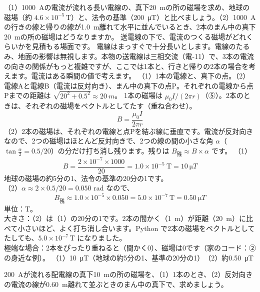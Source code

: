 \label{ph:電-6:ex12}
\begin{phreidai}[送電線の下の磁場]
（1）\qty{1000}{A}の電流が流れる長い電線の、真下\qty{20}{m}の所の磁場を求め、地球の磁場（約 $4.6\times10^{-5}$\,T）と、法令の基準（\qty{200}{\micro T}）と比べましょう。（2）\qty{1000}{A}の行きの線と帰りの線が\qty{1.0}{m}離れて水平に並んでいるとき、2本のまん中の真下\qty{20}{m}の所の磁場はどうなりますか。
\phbamen
送電線の下で、電流のつくる磁場がどれくらいかを見積もる場面です。
\phmushi
電線はまっすぐで十分長いとします。電線のたるみ、地面の影響は無視します。本物の送電線は三相交流（電-11）で、3本の電流の向きの関係がもっと複雑ですが、ここでは1本と、行きと帰りの2本の場合を考えます。電流はある瞬間の値で考えます。
\phzu
（1）1本の電線と、真下の点。（2）電線Aと電線B（電流は反対向き）、まん中の真下の点P。それぞれの電線から点Pまでの距離は $\sqrt{20^2+0.5^2}\approx\qty{20}{m}$。
\phriyu
1本の磁場は $\mu_0I/(2\pi r)$（⑤）。2本のときは、それぞれの磁場をベクトルとしてたす（重ね合わせ）。
\phtateru
\[B=\frac{\mu_0I}{2\pi r}\]
（2）2本の磁場は、それぞれの電線と点Pを結ぶ線に垂直です。電流が反対向きなので、2つの磁場はほとんど反対向きで、2つの線の間の小さな角 $\alpha$（$\tan\tfrac{\alpha}{2}=0.5/20$）の分だけ打ち消し残ります。残りは $B_{\text{残}}\approx B\times\alpha$ です。
\phtoku
（1）\[B=\frac{2\times10^{-7}\times1000}{20}=1.0\times10^{-5}\ \text{T}=\qty{10}{\micro T}\]
地球の磁場の約5分の1、法令の基準の20分の1です。\\
（2）$\alpha\approx2\times0.5/20=0.050$ rad なので、
\[B_{\text{残}}\approx1.0\times10^{-5}\times0.050=5.0\times10^{-7}\ \text{T}=\qty{0.50}{\micro T}\]
\phtashikame
単位：T。\\
大きさ：（2）は（1）の20分の1です。2本の間かく（\qty{1}{m}）が距離（\qty{20}{m}）に比べて小さいほど、よく打ち消し合います。Python で2本の磁場をベクトルとしてたしても、$5.0\times10^{-7}$\,T になりました。\\
極端な場合：2本をぴったり重ねると（間かく0）、磁場は0です（家のコード：②の身近な例）。
\kotae （1）\qty{10}{\micro T}（地球の約5分の1、基準の20分の1）　（2）約\qty{0.50}{\micro T}
\end{phreidai}
\begin{jibun}
\qty{200}{A}が流れる配電線の真下\qty{10}{m}の所の磁場を、（1）1本のとき、（2）反対向きの電流の線が\qty{0.60}{m}離れて並ぶときのまん中の真下で、求めましょう。
\end{jibun}

